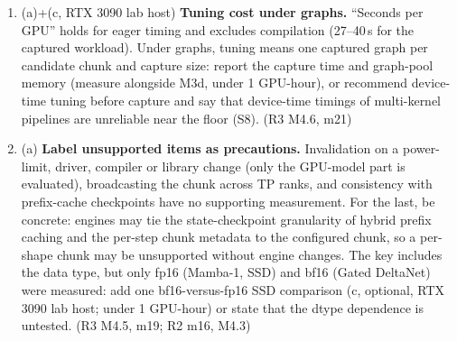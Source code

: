 \documentclass[11pt]{article}
\begin{document}
\begin{enumerate}[label=M7\alph*.]
        production layouts the stride is $B\cdot L$ or the packed token count,
        and $x$ comes from \texttt{xz.chunk(2, dim=1)} of a $[B,2d,L]$
        projection with an offset that may break 16-byte alignment. Define the
        key as the kernel's actual specialization signature (Triton's
        compilation cache key and specialization attributes), verify which
        attributes Triton~3.4 applies to this kernel, and report the
        aligned/unaligned effect for the SSD and Gated DeltaNet kernels on
        captured or packed calls. For the reference CUDA scan, discuss
        $\mathrm{kIsEvenLen} = (L \bmod (\mathrm{kNThreads}\cdot\mathrm{kNItems})
        = 0)$, which changes with the chunk, in Table~1 and Sec.~6.5, and
        state which part of its chunk effect is thread count, items per
        thread and this bit. Make alignment its own action: unaligned lengths
        are about 2$\times$ slower at batch 1 (Fig.~S3: $L=2382$ against
        2048), so recommend padding lengths or strides to a multiple of 16 or
        aligned allocation where the engine allows. A small aligned/unaligned
        re-timing of the production kernels is (c, RTX 3090 lab host; under 1
        GPU-hour). \emph{Where:} Sec.~3 key definition; Sec.~4 ``Compiler
        specialization and parallel shapes'' (main.tex:510--518); Table~1;
        S12. (R2 M8, m15; R3 M4.4)
  \item (a)+(c, RTX 3090 lab host) \textbf{Tuning cost under graphs.}
        ``Seconds per GPU'' holds for eager timing and excludes compilation
        (27--40\,s for the captured workload). Under graphs, tuning means one
        captured graph per candidate chunk and capture size: report the
        capture time and graph-pool memory (measure alongside M3d, under 1
        GPU-hour), or recommend device-time tuning before capture and say
        that device-time timings of multi-kernel pipelines are unreliable near
        the floor (S8). (R3 M4.6, m21)
  \item (a) \textbf{Label unsupported items as precautions.} Invalidation on a
        power-limit, driver, compiler or library change (only the GPU-model
        part is evaluated), broadcasting the chunk across TP ranks, and
        consistency with prefix-cache checkpoints have no supporting
        measurement. For the last, be concrete: engines may tie the
        state-checkpoint granularity of hybrid prefix caching and the
        per-step chunk metadata to the configured chunk, so a per-shape chunk
        may be unsupported without engine changes. The key includes the data
        type, but only fp16 (Mamba-1, SSD) and bf16 (Gated DeltaNet) were
        measured: add one bf16-versus-fp16 SSD comparison (c, optional, RTX
        3090 lab host; under 1 GPU-hour) or state that the dtype dependence is
        untested. (R3 M4.5, m19; R2 m16, M4.3)
\end{enumerate}
\end{document}
